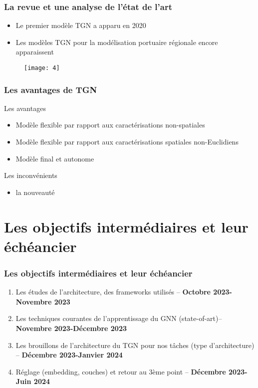 \documentclass{beamer}
\begin{document}
\begin{frame}
	\frametitle{La revue et une analyse de l’état de l’art}
	\begin{itemize}
		\item Le premier modèle TGN a apparu en 2020
		\item Les modèles TGN pour la modélisation portuaire régionale encore apparaissent
	\end{itemize}

	\begin{figure}
	\texttt{[image: 4]}
	\label{fig:example}
\end{figure}
	
\end{frame}

\begin{frame}
	\frametitle{Les avantages de TGN}
	Les avantages
	\begin{itemize}
		\item Modèle flexible par rapport aux caractérisations non-spatiales
		\item Modèle flexible par rapport aux caractérisations spatiales non-Euclidiens
		\item Modèle final et autonome
	\end{itemize}
	Les inconvénients 
	\begin{itemize}
		\item la nouveauté 
	\end{itemize}
	
	
\end{frame}


\section{Les objectifs intermédiaires et leur échéancier}

\begin{frame}
	\frametitle{Les objectifs intermédiaires et leur échéancier}
	\begin{enumerate}
		\item Les études de l'architecture, des frameworks utilisés – \textbf{Octobre 2023-Novembre 2023  }
		\item Les techniques courantes de l'apprentissage du GNN (state-of-art)– \textbf{Novembre 2023-Décembre 2023}
		\item Les brouillons de l'architecture du TGN pour nos tâches (type d'architecture) – \textbf{Décembre 2023-Janvier 2024}
		\item Réglage (embedding, couches) et retour au 3ème point – \textbf{Décembre 2023-Juin 2024}
	\end{enumerate}
\end{frame}
\end{document}
